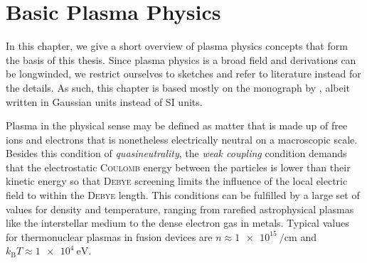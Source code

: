 \section{Basic Plasma Physics}
\label{sec:plasma}

In this chapter, we give a short overview of plasma physics concepts that form the basis of this thesis. Since plasma physics is a broad field and derivations can be longwinded, we restrict ourselves to sketches and refer to literature instead for the details. As such, this chapter is based mostly on the monograph by \textcite{Freidberg14}, albeit written in Gaussian units instead of SI units.

Plasma in the physical sense may be defined as matter that is made up of free ions and electrons that is nonetheless electrically neutral on a macroscopic scale. Besides this condition of \emph{quasineutrality}, the \emph{weak coupling} condition demands that the electrostatic \textsc{Coulomb} energy between the particles is lower than their kinetic energy so that \textsc{Debye} screening limits the influence of the local electric field to within the \textsc{Debye} length. This conditions can be fulfilled by a large set of values for density and temperature, ranging from rarefied astrophysical plasmas like the interstellar medium to the dense electron gas in metals. Typical values for thermonuclear plasmas in fusion devices are $n \approx \SI{1e15}{\per\centi\meter}$ and $k_{\text{B}} T \approx \SI{1e4}{\electronvolt}$.

